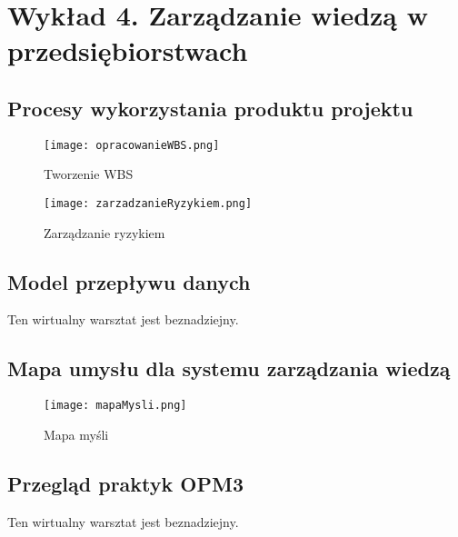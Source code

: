 ﻿\chapter{Wykład 4. Zarządzanie wiedzą w przedsiębiorstwach}

\section{Procesy wykorzystania produktu projektu}

\begin{figure}[hbt]
\centering
\texttt{[image: opracowanieWBS.png]}
\caption{Tworzenie WBS}
\label{fig:opracowanieWBS}
\end{figure}

\begin{figure}[hbt]
\centering
\texttt{[image: zarzadzanieRyzykiem.png]}
\caption{Zarządzanie ryzykiem}
\label{fig:zarzadzanieRyzykiem}
\end{figure}


\section{Model przepływu danych}

Ten wirtualny warsztat jest beznadziejny.


\section{Mapa umysłu dla systemu zarządzania wiedzą}

\begin{figure}[hbt]
\centering
\texttt{[image: mapaMysli.png]}
\caption{Mapa myśli}
\label{fig:mapaMysli}
\end{figure}


\section{Przegląd praktyk OPM3}

Ten wirtualny warsztat jest beznadziejny.


